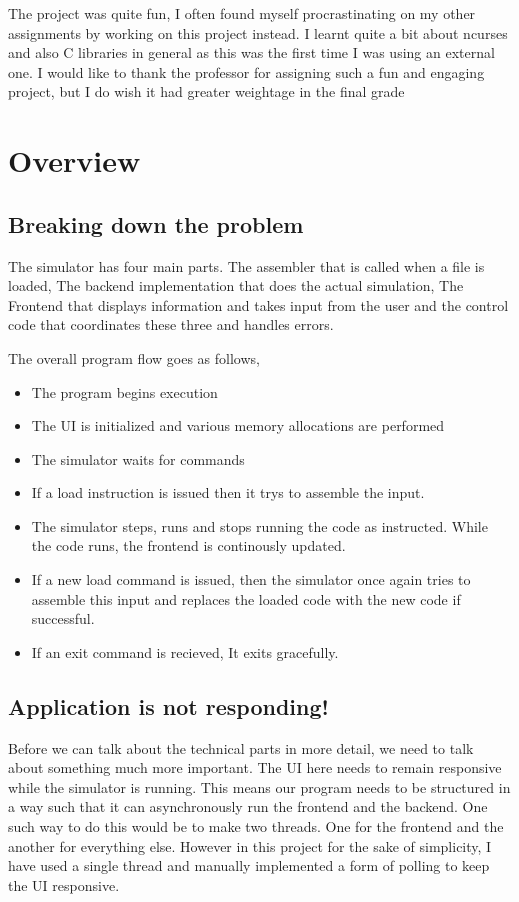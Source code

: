 \documentclass[12pt]{article}
\begin{document}
	The project was quite fun, I often found myself procrastinating on my other assignments by working on this project instead. I learnt quite a bit about ncurses and also C libraries in general as this was the first time I was using an external one. I would like to thank the professor for assigning such a fun and engaging project, but I do wish it had greater weightage in the final grade

	\section{Overview}

	\subsection{Breaking down the problem}

	The simulator has four main parts. The assembler that is called when a file is loaded, The backend implementation that does the actual simulation, The Frontend that displays information and takes input from the user and the control code that coordinates these three and handles errors.

	The overall program flow goes as follows,

	\begin{itemize}
		\item The program begins execution
		\item The UI is initialized and various memory allocations are performed
		\item The simulator waits for commands
		\item If a load instruction is issued then it trys to assemble the input.
		\item The simulator steps, runs and stops running the code as instructed. While the code runs, the frontend is continously updated.
		\item If a new load command is issued, then the simulator once again tries to assemble this input and replaces the loaded code with the new code if successful.
		\item If an exit command is recieved, It exits gracefully.
	\end{itemize}

	\subsection{Application is not responding!}

	Before we can talk about the technical parts in more detail, we need to talk about something much more important. The UI here needs to remain responsive while the simulator is running. This means our program needs to be structured in a way such that it can asynchronously run the frontend and the backend. One such way to do this would be to make two threads. One for the frontend and the another for everything else. However in this project for the sake of simplicity, I have used a single thread and manually implemented a form of polling to keep the UI responsive.
\end{document}
